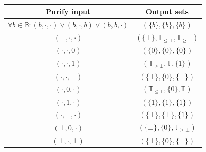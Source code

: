 \begin{table}[h!]
    \centering
    \begin{tabular}{|c|c|}
        \hline
        \rowcolor[HTML]{EAE1E1}
        {\color[HTML]{333333} \textbf{Purify input}}                                         & {\color[HTML]{333333} \textbf{Output sets}}                                                     \\ \hline
        $\forall b \in \mathbb{B}: (b, \cdot, \cdot) \vee  (b, \cdot, b) \vee (b, b, \cdot)$ & $(\{b\},\{b\}, \{b\})$                                                                          \\ \hline
        $(\bot, \cdot, \cdot)$                                                               & $(\{\bot\},\mathbb{T}_{\leq \bot}, \mathbb{T}_{\geq \bot})$                                     \\ \hline
        $(\cdot, \cdot, 0)$                                                                  & $(\{0\},\{0\}, \{0\} )$                                                                         \\ \hline
        $(\cdot, \cdot, 1)$                                                                  & $(\mathbb{T}_{\geq \bot}, \mathbb{T}, \{1\})$                                                   \\ \hline
        $(\cdot, \cdot, \bot)$                                                               & $(\{\bot\}, \{0\}, \{\bot\})$                                                                   \\ \hline
        $(\cdot, 0, \cdot)$                                                                  & $(\mathbb{T}_{\leq \bot},\{0\}, \mathbb{T} )$                                                   \\ \hline
        $(\cdot, 1, \cdot)$                                                                  & $(\{1\},\{1\}, \{1\} )$                                                                         \\ \hline
        $(\cdot, \bot, \cdot)$                                                               & $(\{\bot\}, \{\bot\}, \{1\})$                                                                   \\ \hline
        $(\bot, 0, \cdot)$                                                                   & $(\{\bot\}, \{0\}, \mathbb{T}_{\geq \bot})$                                                     \\ \hline
        $(\bot, \cdot, \bot)$                                                                & $(\{\bot\}, \{0\}, \{\bot\})$                                                                   \\ \hline

\end{tabular}
\end{table}
